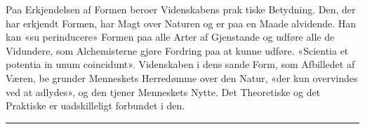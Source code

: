 \documentclass[12pt,a4paper]{book}
\newcommand{\divrule}{\begin{center}\rule{2cm}{0.4pt}\end{center}}
\begin{document}
Paa Erkjendelsen af Formen beroer Videnskabens prak\-%
tiske Betydning. Den, der har erkjendt Formen, har Magt
over Naturen og er paa en Maade alvidende. Han kan «su\-%
perinducere» Formen paa alle Arter af Gjenstande og udføre
alle de Vidundere, som Alchemisterne gjøre Fordring paa at
kunne udføre. «Scientia et potentia in unum coincidunt».
Videnskaben i dens sande Form, som Afbilledet af Væren, be\-%
grunder Menneskets Herredømme over den Natur, «der kun
overvindes ved at adlydes», og den tjener Menneskets Nytte.
Det Theoretiske og det Praktiske er uadskilleligt forbundet
i den.

\divrule
\end{document}
